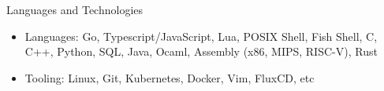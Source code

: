 \documentclass[]{resume}
\begin{document}
	\begin{cvsection}{Languages and Technologies}
		\begin{cvsubsection}{}{}{}	
			\begin{itemize}
				\item Languages: Go, Typescript/JavaScript, Lua, POSIX Shell, Fish Shell, C, C++, Python, SQL, Java, Ocaml, Assembly (x86, MIPS, RISC-V), Rust
				\item Tooling: Linux, Git, Kubernetes, Docker, Vim, FluxCD, etc
			\end{itemize}
		\end{cvsubsection}
	\end{cvsection}
	
\end{document}
